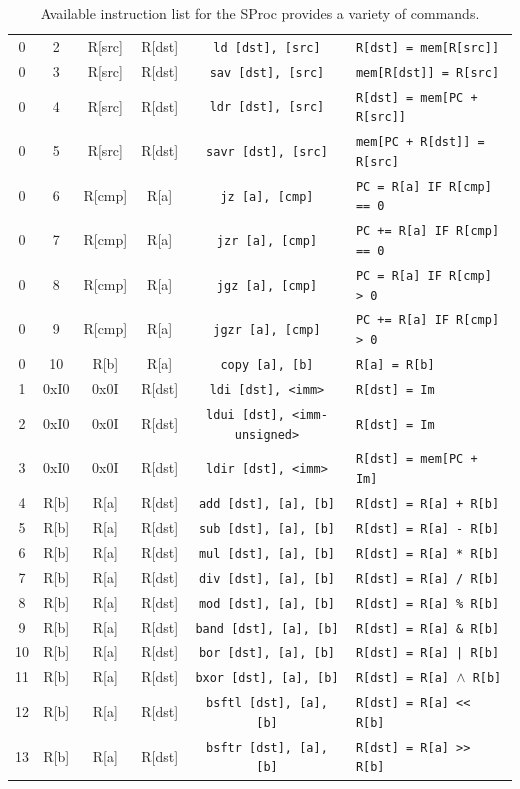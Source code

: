 \documentclass{article}
\begin{document}
\begin{table}[h!]
\begin{footnotesize}
\begin{tabular}{cccc|c|l}
			0 & 2 & R[src] & R[dst] & \texttt{ld [dst], [src]} & \texttt{R[dst] = mem[R[src]]} \\
			0 & 3 & R[src] & R[dst] & \texttt{sav [dst], [src]} & \texttt{mem[R[dst]] = R[src]} \\
			0 & 4 & R[src] & R[dst] & \texttt{ldr [dst], [src]} & \texttt{R[dst] = mem[PC + R[src]]} \\
			0 & 5 & R[src] & R[dst] & \texttt{savr [dst], [src]} & \texttt{mem[PC + R[dst]] = R[src]} \\
			0 & 6 & R[cmp] & R[a] & \texttt{jz [a], [cmp]} & \texttt{PC = R[a] IF R[cmp] == 0} \\
			0 & 7 & R[cmp] & R[a] & \texttt{jzr [a], [cmp]} & \texttt{PC += R[a] IF R[cmp] == 0} \\
			0 & 8 & R[cmp] & R[a] & \texttt{jgz [a], [cmp]} & \texttt{PC = R[a] IF R[cmp] > 0} \\
			0 & 9 & R[cmp] & R[a] & \texttt{jgzr [a], [cmp]} & \texttt{PC += R[a] IF R[cmp] > 0} \\
			0 & 10 & R[b] & R[a] & \texttt{copy [a], [b]} & \texttt{R[a] = R[b]} \\
			1 & 0xI0 & 0x0I & R[dst] & \texttt{ldi [dst], <imm>} & \texttt{R[dst] = Im} \\
			2 & 0xI0 & 0x0I & R[dst] & \texttt{ldui [dst], <imm-unsigned>} & \texttt{R[dst] = Im} \\
			3 & 0xI0 & 0x0I & R[dst] & \texttt{ldir [dst], <imm>} & \texttt{R[dst] = mem[PC + Im]} \\
			4 & R[b] & R[a] & R[dst] & \texttt{add [dst], [a], [b]} & \texttt{R[dst] = R[a] + R[b]} \\
			5 & R[b] & R[a] & R[dst] & \texttt{sub [dst], [a], [b]} & \texttt{R[dst] = R[a] - R[b]} \\
			6 & R[b] & R[a] & R[dst] & \texttt{mul [dst], [a], [b]} & \texttt{R[dst] = R[a] * R[b]} \\
			7 & R[b] & R[a] & R[dst] & \texttt{div [dst], [a], [b]} & \texttt{R[dst] = R[a] / R[b]} \\
			8 & R[b] & R[a] & R[dst] & \texttt{mod [dst], [a], [b]} & \texttt{R[dst] = R[a] \% R[b]} \\
			9 & R[b] & R[a] & R[dst] & \texttt{band [dst], [a], [b]} & \texttt{R[dst] = R[a] \& R[b]} \\
			10 & R[b] & R[a] & R[dst] & \texttt{bor [dst], [a], [b]} & \texttt{R[dst] = R[a] | R[b]} \\
			11 & R[b] & R[a] & R[dst] & \texttt{bxor [dst], [a], [b]} & \texttt{R[dst] = R[a] $\wedge$ R[b]} \\
			12 & R[b] & R[a] & R[dst] & \texttt{bsftl [dst], [a], [b]} & \texttt{R[dst] = R[a] << R[b]} \\
			13 & R[b] & R[a] & R[dst] & \texttt{bsftr [dst], [a], [b]} & \texttt{R[dst] = R[a] >> R[b]} \\
			\hline
		\end{tabular}
	\end{footnotesize}
	\caption{Available instruction list for the SProc provides a variety of commands.}
	\label{table:instruction-table}
\end{table}
\end{document}
